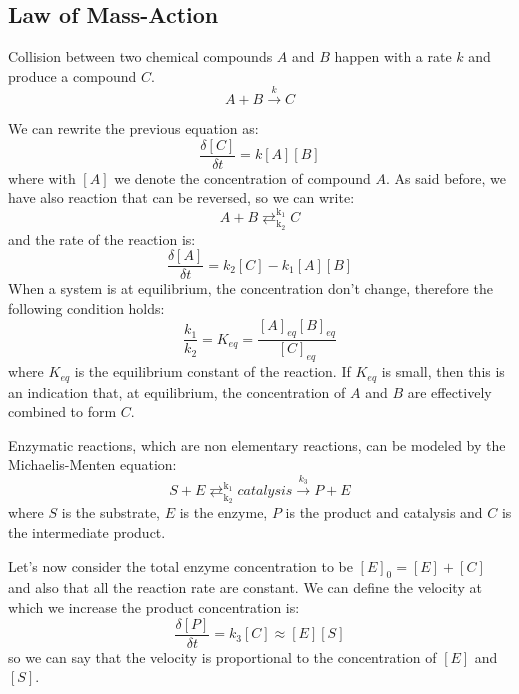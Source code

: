 \subsection{Law of Mass-Action}
Collision between two chemical compounds $A$ and $B$ happen with a rate $k$ and
produce a compound $C$.
\begin{equation*}
    A + B \xrightarrow{k} C
\end{equation*}

We can rewrite the previous equation as:
\begin{equation}
    \frac{\delta [C]}{\delta t} = k [A][B]
\end{equation}
where with $[A]$ we denote the concentration of compound $A$. As said before,
we have also reaction that can be reversed, so we can write:
\begin{equation}
    A + B \mathrel{\mathop{\rightleftarrows}^{\mathrm{k_1}}_{\mathrm{k_2}}} C
\end{equation}
and the rate of the reaction is:
\begin{equation}
    \frac{\delta [A]}{\delta t} = k_2 [C] - k_1 [A][B]
\end{equation}
When a system is at equilibrium, the concentration don't change, therefore the
following condition holds:
\begin{equation}
    \frac{k_1}{k_2} = K_{eq} = \frac{[A]_{eq} [B]_{eq}}{[C]_{eq}}
\end{equation}
where $K_{eq}$ is the equilibrium constant of the reaction. If $K_{eq}$ is small,
then this is an indication that, at equilibrium, the concentration of $A$ and $B$
are effectively combined to form $C$.

Enzymatic reactions, which are non elementary reactions, can be modeled by the
Michaelis-Menten equation:
\begin{equation}
    S + E \mathrel{\mathop{\rightleftarrows}^{\mathrm{k_1}}_{\mathrm{k_2}}} catalysis \xrightarrow{k_3} P + E
\end{equation}
where $S$ is the substrate, $E$ is the enzyme, $P$ is the product and catalysis
and $C$ is the intermediate product.

Let's now consider the total enzyme concentration to be $[E]_0 = [E] + [C]$ and
also that all the reaction rate are constant. We can define the velocity at which
we increase the product concentration is:
\begin{equation}
    \frac{\delta [P]}{\delta t} = k_3 [C] \approx [E][S]
\end{equation}
so we can say that the velocity is proportional to the concentration of $[E]$ and
$[S]$.

